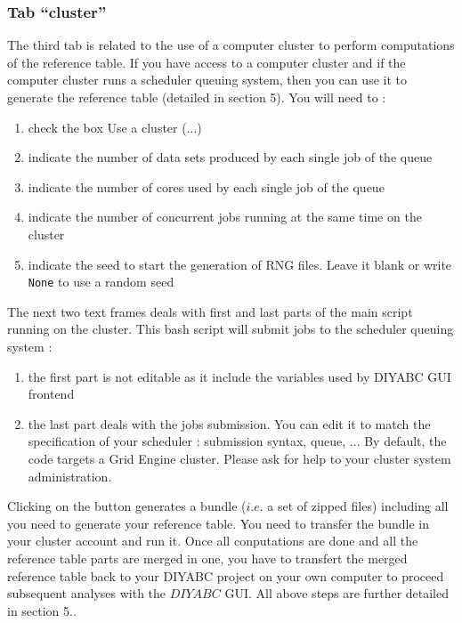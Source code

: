 \subsubsection{Tab \textsf{``cluster''}}\label{clustergui}
The third tab  is related to the use of a computer cluster to perform computations of the reference table. If you have access to a computer cluster and if the computer cluster runs a scheduler queuing system, then you can use it to generate the reference table (detailed in section 5). You will need to :
\begin{enumerate}
 \item check the box \textsf{Use a cluster (...)}
 \item indicate the number of data sets produced by each single job of the queue
 \item indicate the number of cores used by each single job of the queue
 \item indicate the number of concurrent jobs running at the same time on the cluster
 \item indicate the seed to start the generation of RNG files. Leave it blank or write \texttt{None} to use a random seed
\end{enumerate}

The next two text frames deals with first and last parts of the main script running on the cluster. This bash script will submit jobs to the scheduler queuing system :
\begin{enumerate}
 \item the first part is not editable as it include the variables used by DIYABC GUI frontend
 \item the last part deals with the jobs submission. You can edit it to match the specification of your scheduler : submission syntax, queue, ... By default, the code targets a Grid Engine cluster. Please ask for help to your cluster system administration.
\end{enumerate}


Clicking on the  button generates a bundle ($i.e.$ a set of zipped files) including all you need to generate your reference table. You need to transfer the bundle in your cluster account and run it. Once all conputations are done and all the reference table parts are merged in one, you have to transfert the merged reference table back to your DIYABC project on your own computer to proceed subsequent analyses with the $DIYABC$ GUI. All above steps are further detailed in section 5..

